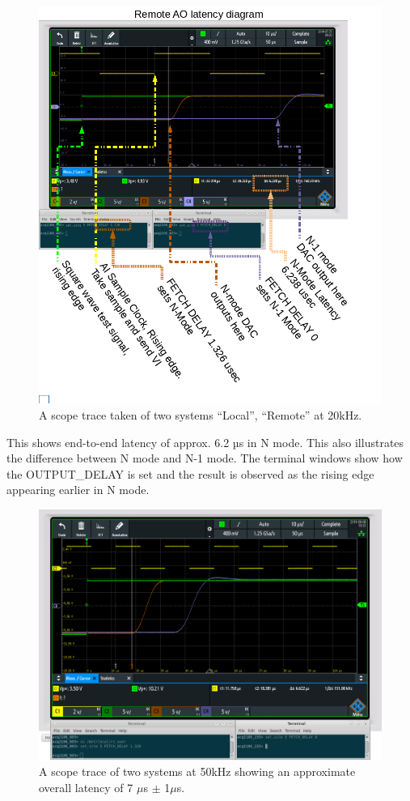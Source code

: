 \documentclass{article}
\begin{document}
\begin{figure}
	\centering
	\includegraphics[width=5.0in]{images/20kHz_annotated_scope.png}
	\caption{A scope trace taken of two systems “Local”, “Remote” at 20kHz.}
	\label{zcopy20scope}
\end{figure}

This shows end-to-end latency of  approx. 6.2 µs in N mode. 
This also illustrates the difference between N mode and N-1 mode.
The terminal windows show how the OUTPUT\_DELAY is set and the result is observed as the rising edge appearing earlier in N mode.

\begin{figure}
	\centering
	\includegraphics[width=5.0in]{images/50kHz_annotated_scope.png}
	\caption{A scope trace of two systems at 50kHz showing an approximate overall latency of 7 $\mu$s $\pm$ 1$\mu$s.}
	\label{zcopy50scope}
\end{figure}
\end{document}
